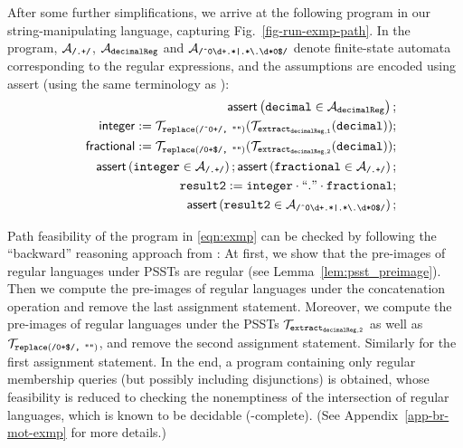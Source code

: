 After some further simplifications, we arrive at the following program
in our string-manipulating language, capturing Fig.~\ref{fig-run-exmp-path}.  In
the program, $\mathcal{A}_{\scriptsize\mbox{\tt/.+/}}$, $\mathcal{A}_{\tt decimalReg}$
and
$\mathcal{A}_{\scriptsize\mbox{\tt /\^{}0\textbackslash
    d+.*|.*{\scriptsize\textbackslash}.\textbackslash d*0\$/}}$ denote
finite-state automata corresponding to the regular expressions, and
the assumptions are encoded using \textsf{assert} (using the same
terminology as \cite{CHL+19}):
\begin{eqnarray}\label{eqn:exmp}
& & \textsf{assert}\left(\tt decimal \in \mathcal{A}_{decimalReg}\right);\nonumber \\
& & \sf integer  := \tt  \mathcal{T}_{\tt replace(\mbox{\scriptsize \tt /\^{}0+/, ""})}(\mathcal{T}_{\tt extract_{decimalReg,1}}(decimal));\nonumber \\
& & \sf fractional  := \tt  \mathcal{T}_{\scriptsize\tt replace(\mbox{\tt /0+\$/, ""})}(\mathcal{T}_{\tt extract_{decimalReg,2}}(decimal)); \\
&&  \textsf{assert}\left(\tt integer \in \mathcal{A}_{\scriptsize\mbox{\tt/.+/}}\right); 
\textsf{assert}\left(\tt fractional \in \mathcal{A}_{\scriptsize\mbox{\tt/.+/}}\right); \nonumber\\
 && \tt result2 := integer \cdot ``." \cdot fractional; \nonumber\\
 && \textsf{assert}\left(\tt result2 \in \mathcal{A}_{\scriptsize\mbox{\tt /\^{}0\textbackslash d+.*|.*{\scriptsize\textbackslash}.\textbackslash d*0\$/}}\right); \nonumber
\end{eqnarray}

Path feasibility of the program in \eqref{eqn:exmp} can be checked by following the ``backward'' reasoning approach from \cite{CHL+19}: At first, we show that the pre-images of regular languages under PSSTs are regular (see Lemma~\ref{lem:psst_preimage}). Then we compute the pre-images of regular languages under the concatenation operation and remove the last assignment statement. Moreover, we compute the pre-images of regular languages under the PSSTs $\mathcal{T}_{\tt extract_{decimalReg,2}}$ as well as $\mathcal{T}_{\scriptsize\tt replace(\mbox{\tt /0+\$/, ""})}$, and remove the second assignment statement. Similarly for the first assignment statement. In the end, a program containing only regular membership queries (but possibly including disjunctions) is obtained, whose feasibility is reduced to checking the nonemptiness of the intersection of regular languages, which is known to be decidable (\pspace-complete). (See Appendix~\ref{app-br-mot-exmp} for more details.)

